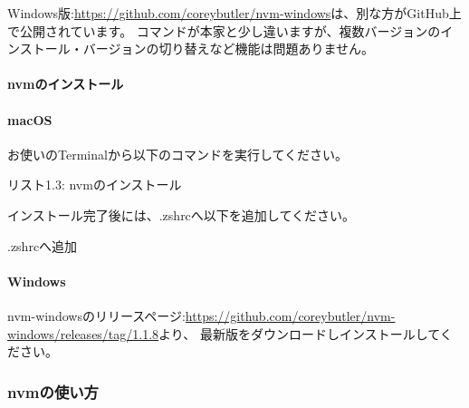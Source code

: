 \vspace*{\baselineskip}

Windows版:\url{https://github.com/coreybutler/nvm-windows}は、別な方がGitHub上で公開されています。
コマンドが本家と少し違いますが、複数バージョンのインストール・バージョンの切り替えなど機能は問題ありません。

\paragraph*{nvmのインストール}
\paragraph*{macOS}
お使いのTerminalから以下のコマンドを実行してください。

\def\startercodeblockfontsize{}
\begin{starterterminal}[_116146867]{リスト1.3: nvmのインストール}\end{starterterminal}

インストール完了後には、.zshrcへ以下を追加してください。

\def\startercodeblockfontsize{}
\begin{starterterminal}[]{.zshrcへ追加}\end{starterterminal}
\ParagraphEnd

\paragraph*{Windows}
nvm{-}windowsのリリースページ:\url{https://github.com/coreybutler/nvm-windows/releases/tag/1.1.8}より、
最新版をダウンロードしインストールしてください。

\ParagraphEnd

\subsubsection*{nvmの使い方}
\keeplastskip{
  \label{sec:1-1-3-1}
  \par\nobreak
}


